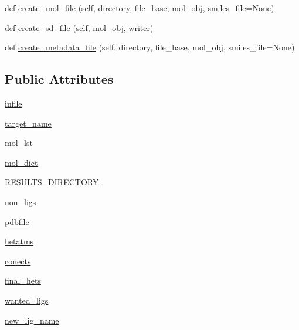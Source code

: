 \begin{DoxyCompactItemize}
def \hyperlink{classfragalysis__api_1_1xcimporter_1_1conversion__pdb__mol_1_1_ligand_a811498c568a5f12e8047ced3640a3c90}{create\+\_\+mol\+\_\+file} (self, directory, file\+\_\+base, mol\+\_\+obj, smiles\+\_\+file=None)
\item 
def \hyperlink{classfragalysis__api_1_1xcimporter_1_1conversion__pdb__mol_1_1_ligand_a9985de5dae739f11768aa6985ccd94bd}{create\+\_\+sd\+\_\+file} (self, mol\+\_\+obj, writer)
\item 
def \hyperlink{classfragalysis__api_1_1xcimporter_1_1conversion__pdb__mol_1_1_ligand_a58df3b55a6aca35511598a8d0e25ed6d}{create\+\_\+metadata\+\_\+file} (self, directory, file\+\_\+base, mol\+\_\+obj, smiles\+\_\+file=None)
\end{DoxyCompactItemize}
\subsection*{Public Attributes}
\begin{DoxyCompactItemize}
\item 
\hyperlink{classfragalysis__api_1_1xcimporter_1_1conversion__pdb__mol_1_1_ligand_a32128e8047085e698f5ca00f3c5272a9}{infile}
\item 
\hyperlink{classfragalysis__api_1_1xcimporter_1_1conversion__pdb__mol_1_1_ligand_a7bacd3ad4cf07e41aed7a9f2a4ff387a}{target\+\_\+name}
\item 
\hyperlink{classfragalysis__api_1_1xcimporter_1_1conversion__pdb__mol_1_1_ligand_ac4eb80e71c44f6b864a952f225cd8004}{mol\+\_\+lst}
\item 
\hyperlink{classfragalysis__api_1_1xcimporter_1_1conversion__pdb__mol_1_1_ligand_a19412f84749bbb24a26587412126c63d}{mol\+\_\+dict}
\item 
\hyperlink{classfragalysis__api_1_1xcimporter_1_1conversion__pdb__mol_1_1_ligand_aae0e03b03bc78f6d2df7f84a6df36901}{R\+E\+S\+U\+L\+T\+S\+\_\+\+D\+I\+R\+E\+C\+T\+O\+RY}
\item 
\hyperlink{classfragalysis__api_1_1xcimporter_1_1conversion__pdb__mol_1_1_ligand_a9f563bbab62fe3a11a8922c820b94e42}{non\+\_\+ligs}
\item 
\hyperlink{classfragalysis__api_1_1xcimporter_1_1conversion__pdb__mol_1_1_ligand_ae69abc7403000638fc3a713f52254154}{pdbfile}
\item 
\hyperlink{classfragalysis__api_1_1xcimporter_1_1conversion__pdb__mol_1_1_ligand_a9ca075a4d8a93d03faf8a68d2ca8cb22}{hetatms}
\item 
\hyperlink{classfragalysis__api_1_1xcimporter_1_1conversion__pdb__mol_1_1_ligand_ae95cb0d8d1e5783aa0959ce6fe03256b}{conects}
\item 
\hyperlink{classfragalysis__api_1_1xcimporter_1_1conversion__pdb__mol_1_1_ligand_ad7639b1a8c8c767a298eb7454bf5e3fd}{final\+\_\+hets}
\item 
\hyperlink{classfragalysis__api_1_1xcimporter_1_1conversion__pdb__mol_1_1_ligand_ae4f4ee5bf6c21bd59c1e52da2b4f67b5}{wanted\+\_\+ligs}
\item 
\hyperlink{classfragalysis__api_1_1xcimporter_1_1conversion__pdb__mol_1_1_ligand_af2f58c632ceb036a9502c33f2681aba9}{new\+\_\+lig\+\_\+name}
\end{DoxyCompactItemize}


